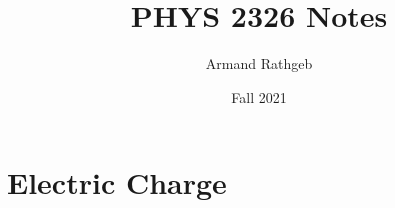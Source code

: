 \documentclass{article}
\title{PHYS 2326 Notes}
\author{Armand Rathgeb}
\date{Fall 2021}
\begin{document}
  \maketitle
  \newpage
  \section{Electric Charge}
    
  \section{}
\end{document}
